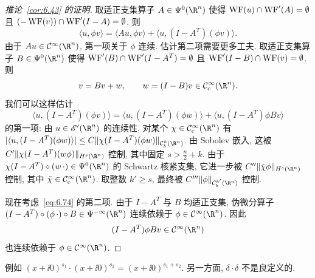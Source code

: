 \begin{proof}[推论~\ref{cor:6.43} 的证明]
取适正支集算子 $A \in \Psi^0(\R^n)$ 使得 $\operatorname{WF}(u) \cap \operatorname{WF}'(A) = \emptyset$ 且 $(-\operatorname{WF}(v)) \cap \operatorname{WF}'(I - A) = \emptyset$. 则
\begin{equation}\label{eq:6.72}
    \langle u, \phi v \rangle = \langle A u, \phi v \rangle + \langle u, (I - A^T)(\phi v) \rangle.
\end{equation}
由于 $A u \in \Smooth(\R^n)$, 第一项关于 $\phi$ 连续. 估计第二项需要更多工夫. 取适正支集算子 $B \in \Psi^0(\R^n)$ 使得 $\operatorname{WF}'(B) \cap \operatorname{WF}'(I - A^T) = \emptyset$ 且 $\operatorname{WF}'(I - B) \cap \operatorname{WF}(v) = \emptyset$. 则
\begin{equation}\label{eq:6.73}
    v = B v + w, \qquad w = (I - B) v \in \SmoothComp(\R^n).
\end{equation}
我们可以这样估计
\begin{equation}\label{eq:6.74}
    \langle u, (I - A^T)(\phi v) \rangle = \langle u, (I - A^T)(\phi w) \rangle + \langle u, (I - A^T)\phi B v \rangle
\end{equation}
的第一项: 由 $u \in \mathscr{E}'(\R^n)$ 的连续性, 对某个 $\chi \in \SmoothComp(\R^n)$ 有
$|\langle u, (I - A^T)(\phi w) \rangle| \le C \|\chi (I - A^T)(\phi w)\|_{\mathcal{C}^k_b(\R^n)}$. 由 Sobolev 嵌入, 这被 $C' \|\chi (I - A^T)(w\phi)\|_{H^s(\R^n)}$ 控制, 其中固定 $s > \tfrac{n}{2} + k$. 由于 $\chi (I - A^T) \circ (w\,\cdot) \in \Psi^0(\R^n)$ 的 Schwartz 核紧支集, 它进一步被 $C'' \|\tilde{\chi}\phi\|_{H^s(\R^n)}$ 控制, 其中 $\tilde{\chi} \in \SmoothComp(\R^n)$. 取整数 $k' \ge s$, 最终被 $C''' \|\phi\|_{\mathcal{C}^{k'}_b(\R^n)}$ 控制.

现在考虑~\eqref{eq:6.74} 的第二项. 由于 $I - A^T$ 与 $B$ 均适正支集, 伪微分算子 $(I - A^T) \circ (\phi\,\cdot) \circ B \in \Psi^{-\infty}(\R^n)$ 连续依赖于 $\phi \in \Smooth(\R^n)$. 因此
\begin{equation}\label{eq:6.75}
    (I - A^T)\phi B v \in \Smooth(\R^n)
\end{equation}
也连续依赖于 $\phi \in \Smooth(\R^n)$.
\end{proof}

例如 $(x + \ii 0)^{s_1} \cdot (x + \ii 0)^{s_2} = (x + \ii 0)^{s_1 + s_2}$. 另一方面, $\delta \cdot \delta$ 不是良定义的.

